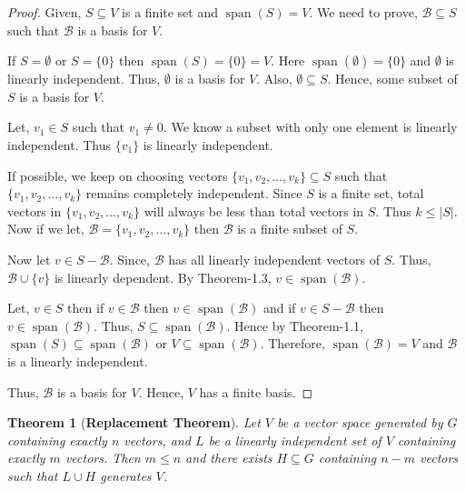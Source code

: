 \documentclass[12pt, a4paper]{article}
\newtheorem{theorem}{Theorem}[section]
\theoremstyle{definition}
\theoremstyle{remark}
\newcommand{\B}{\mathscr{B}}
\DeclareMathOperator{\Span}{span}
\begin{document}
\begin{proof}
    Given, $S \subseteq V$ is a finite set and $\Span(S) = V$. We need to prove, $\B \subseteq S$ such that $\B$ is a basis for $V$.

If $S = \emptyset$ or $S = \{0\}$ then $\Span(S) = \{0\} = V$. Here $\Span(\emptyset) = \{0\}$ and $\emptyset$ is linearly independent. Thus, $\emptyset$ is a basis for $V$.
Also, $\emptyset \subseteq S$. Hence, some subset of $S$ is a basis for $V$.

Let, $v_1 \in S$ such that $v_1 \neq 0$. We know a subset with only one element is linearly independent. Thus $\{v_1\}$ is linearly independent.

If possible, we keep on choosing vectors $\{v_1, v_2, \dots, v_k\} \subseteq S$ such that $\{v_1, v_2, \dots, v_k\}$ remains completely independent. Since $S$ is a finite set, total vectors in $\{v_1, v_2, \dots, v_k\}$ will always be less than total vectors in $S$. Thus $k \leq |S|$. Now if we let, $\B = \{v_1, v_2, \dots, v_k\}$ then $\B$ is a finite subset of $S$.

Now let $v \in S - \B$. Since, $\B$ has all linearly independent vectors of $S$. Thus, $\B \cup \{v\}$ is linearly dependent. By Theorem-1.3, $v \in \Span(\B)$.

Let, $v \in S$ then if $v \in \B$ then $v \in \Span(\B)$ and if $v \in S - \B$ then $v \in \Span(\B)$. Thus, $S \subseteq \Span(\B)$. Hence by Theorem-1.1, $\Span(S) \subseteq \Span(\B)$ or $V \subseteq \Span(\B)$. Therefore, $\Span(\B) = V$ and $\B$ is a linearly independent.

Thus, $\B$ is a basis for $V$. Hence, $V$ has a finite basis.
\end{proof}

\begin{theorem}[\textbf{Replacement Theorem}]
    Let $V$ be a vector space generated by $G$ containing exactly $n$ vectors, and $L$ be a linearly independent set of $V$ containing exactly $m$ vectors. Then $m \leq n$ and there exists $H \subseteq G$ containing $n-m$ vectors such that $L \cup H$ generates $V$.
\end{theorem}
\end{document}
